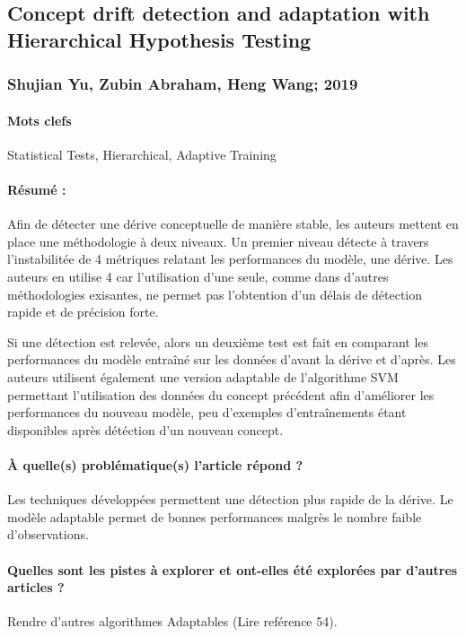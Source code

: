 \documentclass[11pt,a4paper]{report}
\begin{document}
\subsection{Concept drift detection and adaptation with Hierarchical Hypothesis Testing}
\subsubsection{Shujian Yu, Zubin Abraham, Heng Wang; 2019}

\paragraph{Mots clefs} Statistical Tests, Hierarchical, Adaptive Training

\paragraph{Résumé :} Afin de détecter une dérive conceptuelle de manière stable, les auteurs mettent en place une méthodologie à deux niveaux. Un premier niveau détecte à travers l'instabilitée de 4 métriques relatant les performances du modèle, une dérive. Les auteurs en utilise 4 car l'utilisation d'une seule, comme dans d'autres méthodologies exisantes, ne permet pas l'obtention d'un délais de détection rapide et de précision forte.

Si une détection est relevée, alors un deuxième test est fait en comparant les performances du modèle entraîné sur les données d'avant la dérive et d'après. Les auteurs utilisent également une version adaptable de l'algorithme SVM permettant l'utilisation des données du concept précédent afin d'améliorer les performances du nouveau modèle, peu d'exemples d'entraînements étant disponibles après détéction d'un nouveau concept.

\paragraph{À quelle(s) problématique(s) l'article répond ?} Les techniques développées permettent une détection plus rapide de la dérive. Le modèle adaptable permet de bonnes performances malgrès le nombre faible d'observations.

\paragraph{Quelles sont les pistes à explorer et ont-elles  été explorées par d'autres articles ?} Rendre d'autres algorithmes Adaptables (Lire  reférence 54).
\end{document}
